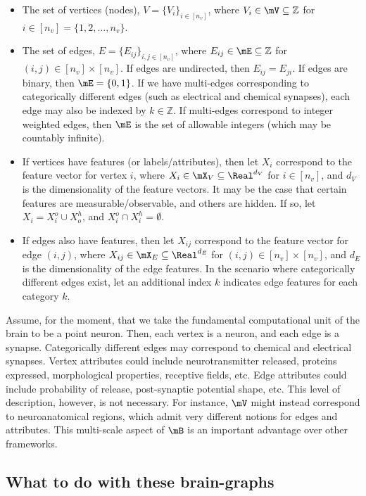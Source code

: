 \begin{itemize}
	\item The set of vertices (nodes), $V=\{V_i\}_{i\in[n_v]}$, where $V_i \in \mV \subseteq \mathbb{Z}$ for $i \in [n_v]=\{1,2,\ldots,n_v\}$. 
	\item The set of edges, $E=\{E_{ij}\}_{i,j \in [n_v]}$, where $E_{ij} \in \mE \subseteq \mathbb{Z}$ for $(i,j) \in [n_v] \times [n_v]$.  If edges are undirected, then $E_{ij}=E_{ji}$.  If edges are binary, then $\mE=\{0,1\}$.  If we have multi-edges corresponding to categorically different edges (such as electrical and chemical synapses), each edge may also be indexed by $k \in \mathbb{Z}$. If multi-edges correspond to integer weighted edges, then $\mE$ is the set of allowable integers (which may be countably infinite).
	\item If vertices have features (or labels/attributes), then let $X_i$ correspond to the feature vector for vertex $i$, where $X_i \in \mX_V \subseteq \Real^{d_V}$ for $i \in [n_v]$, and $d_V$ is the dimensionality of the feature vectors.  It may be the case that certain features are measurable/observable, and others are hidden.  If so, let $X_i = X^o_i \cup X^h_o$, and $X^o_i \cap X^h_i = \emptyset$.
	\item If edges also have features, then let $X_{ij}$ correspond to the feature vector for edge $(i,j)$, where $X_{ij} \in \mX_E \subseteq \Real^{d_E}$ for $(i,j) \in [n_v] \times [n_v]$, and $d_E$ is the dimensionality of the edge features.  In the scenario where categorically different edges exist, let an additional index $k$ indicates edge features for each category $k$.
\end{itemize}

Assume, for the moment, that we take the fundamental computational unit of the brain to be a point neuron.  Then, each vertex is a neuron, and each edge is a synapse.  Categorically different edges may correspond to chemical and electrical synapses. Vertex attributes could include neurotransmitter released, proteins expressed, morphological properties, receptive fields, etc.  Edge attributes could include probability of release, post-synaptic potential shape, etc.  This level of description, however, is not necessary.  For instance, $\mV$ might instead correspond to neuroanatomical regions, which admit very different notions for edges and attributes.  This multi-scale aspect of $\mB$ is an important advantage over other frameworks.  

\subsection{What to do with these brain-graphs}


